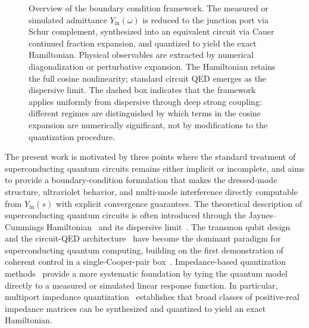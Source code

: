 \documentclass[reprint, floatfix, superscriptaddress, amsmath, amssymb, longbibliography]{revtex4-2}
\newcommand{\Yin}{Y_{\mathrm{in}}}
\begin{document}
\begin{figure}[t]
\caption{Overview of the boundary condition framework. The measured or simulated admittance $\Yin(\omega)$ is reduced to the junction port via Schur complement, synthesized into an equivalent circuit via Cauer continued fraction expansion, and quantized to yield the exact Hamiltonian. Physical observables are extracted by numerical diagonalization or perturbative expansion. The Hamiltonian retains the full cosine nonlinearity; standard circuit QED emerges as the dispersive limit. The dashed box indicates that the framework applies uniformly from dispersive through deep strong coupling: different regimes are distinguished by which terms in the cosine expansion are numerically significant, not by modifications to the quantization procedure.}
\label{fig:framework_overview}
\end{figure}


The present work is motivated by three points where the standard treatment of superconducting quantum circuits remains either implicit or incomplete, and aims to provide a boundary-condition formulation that makes the dressed-mode structure, ultraviolet behavior, and multi-mode interference directly computable from $\Yin(s)$ with explicit convergence guarantees. The theoretical description of superconducting quantum circuits is often introduced through the Jaynes--Cummings Hamiltonian~\cite{JaynesCummings1963} and its dispersive limit~\cite{Koch2007, Blais2004, Blais2021}. The transmon qubit design~\cite{Koch2007} and the circuit-QED architecture~\cite{Wallraff2004, Schuster2007} have become the dominant paradigm for superconducting quantum computing, building on the first demonstration of coherent control in a single-Cooper-pair box~\cite{Nakamura1999}. Impedance-based quantization methods~\cite{Nigg2012, Solgun2014, Solgun2015, ParraRodriguez2018, ParraRodriguez2019, Vool2017, Minev2021, Lu2025} provide a more systematic foundation by tying the quantum model directly to a measured or simulated linear response function. In particular, multiport impedance quantization~\cite{Solgun2014, Solgun2015, Egusquiza2022, Labarca2024, Alghadeer2025} establishes that broad classes of positive-real impedance matrices can be synthesized and quantized to yield an exact Hamiltonian.
\end{document}
